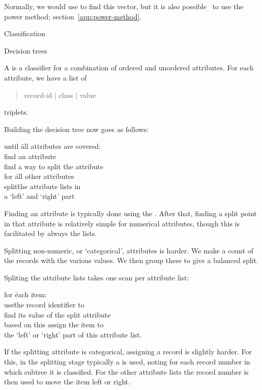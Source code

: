 Normally, we would use  to find this vector,
but it is also possible~\cite{LinCohen:PIC} to use the power method;
section~\ref{app:power-method}.


 {Classification}

 {Decision trees}

A  is a classifier for a combination of ordered and
unordered attributes. For each attribute, we have a list of
\begin{quote}
  record-id $|$ class $|$ value
\end{quote}
triplets.

Building the decision tree now goes as follows:\\
\begin{tabbing}
  until \=all attributes are covered:\\
  \>find an attribute\\
  \>find a way to split the attribute\\
  \>for \=all other attributes\\
  \>\>split\= the attribute lists in\\
  \>\>\>a `left' and `right' part
\end{tabbing}

Finding an attribute is typically done using the . After that, finding a split point in that attribute is
relatively simple for numerical attributes, though this is facilitated
by always  the lists.

Splitting non-numeric, or `categorical', attributes is harder. We make
a count of the records with the various values. We then group these to
give a balanced split.

Spliting the attribute lists takes one
scan per attribute list:\\
\begin{tabbing}
  for \=each item:\\
  \>use\= the record identifier to\\
  \>\>find its value of the split attribute\\
  \>based on this assign the item to\\
  \>\>the `left' or `right' part of this attribute list.
\end{tabbing}

If the splitting attribute is categorical, assigning a record is
slightly harder. For this, in the splitting stage
typically a  is used, noting for each record
number in which subtree it is classified. For the other attribute
lists the record number is then used to move the item left or right.

